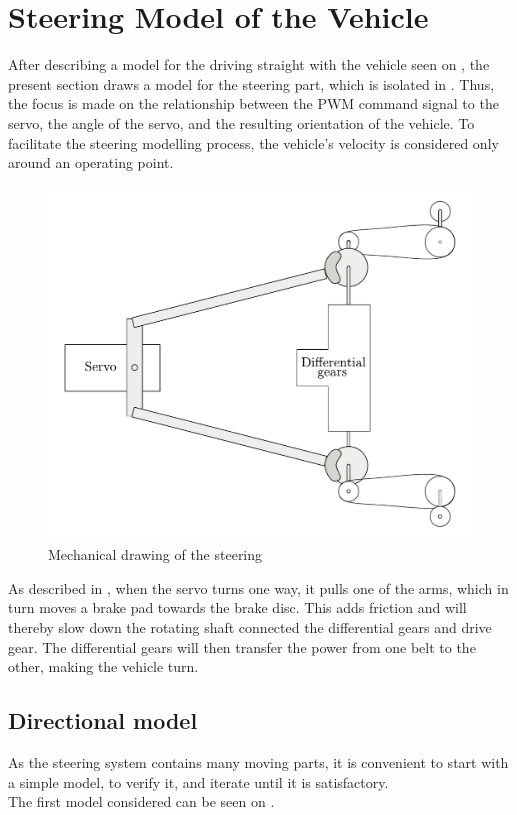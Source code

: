\section{Steering Model of the Vehicle}\label{sec:SteeringModel}
After describing a model for the driving straight with the vehicle seen on , the present section draws a model for the steering part, which is isolated in . Thus, the focus is made on the relationship between the PWM command signal to the servo, the angle of the servo, and the resulting orientation of the vehicle. To facilitate the steering modelling process, the vehicle's velocity is considered only around an operating point.

 \begin{figure}[H]
 	\centering
 	\includegraphics[scale=0.8]{figures/steeringMechanical.pdf}
 	\caption{Mechanical drawing of the steering}
 	\label{steeringMechanical}
 \end{figure}

As described in , when the servo turns one way, it pulls one of the arms, which in turn moves a brake pad towards the brake disc. This adds friction and will thereby slow down the rotating shaft connected the differential gears and drive gear. The differential gears will then transfer the power from one belt to the other, making the vehicle turn.


\subsection{Directional model}
As the steering system contains many moving parts, it is convenient to start with a simple model, to verify it, and iterate until it is satisfactory.\\
%
The first model considered can be seen on .

